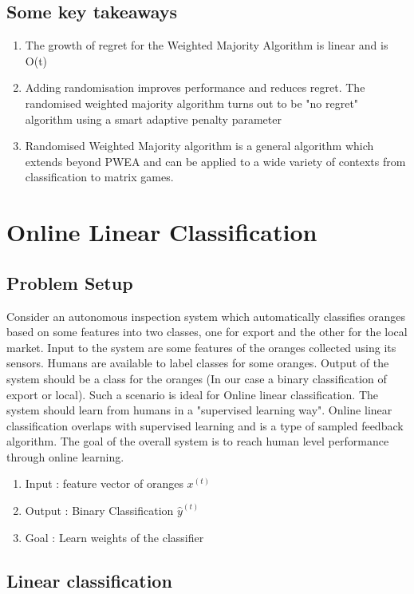 \documentclass[11pt]{article}
\begin{document}
\subsection{Some key takeaways}
\begin{enumerate}
    \item The growth of regret for the Weighted Majority Algorithm is linear and is O(t)
    \item Adding randomisation improves performance and reduces regret. The randomised weighted majority algorithm turns out to be "no regret" algorithm using a smart adaptive penalty parameter
    \item Randomised Weighted Majority algorithm is a general algorithm which extends beyond PWEA and can be applied to a wide variety of contexts from classification to matrix games.
    
\end{enumerate}

\section{Online Linear Classification}
\subsection{Problem Setup}
Consider an autonomous inspection system which automatically classifies oranges based on some features into two classes, one for export and the other for the local market. Input to the system are some features of the oranges collected using its sensors. Humans are available to label classes for some oranges. Output of the system should be a class for the oranges (In our case a binary classification of export or local). Such a scenario is ideal for Online linear classification. The system should learn from humans in a "supervised learning way". Online linear classification overlaps with supervised learning and is a type of sampled feedback algorithm. The goal of the overall system is to reach human level performance through online learning.

\begin{enumerate}
    \item Input : feature vector of oranges $x^{(t)}$
    \item Output : Binary Classification  $\hat{y}^{(t)}$
    \item Goal : Learn weights of the classifier
\end{enumerate}

\subsection{Linear classification}
\end{document}

